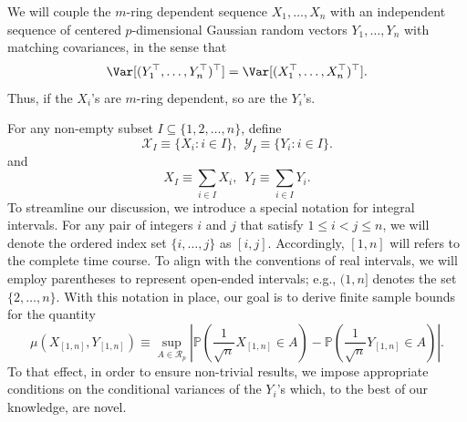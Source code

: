 \documentclass[aos]{imsart}
\begin{document}
We will couple the $m$-ring dependent sequence $X_1,\ldots,X_n$ with an independent sequence of centered $p$-dimensional Gaussian random vectors  $Y_1, \dots, Y_n$  with matching covariances, in the sense that
\begin{equation*}
    \Var[(Y_1^\top, \dots, Y_n^\top)^\top] = \Var[(X_1^\top, \dots, X_n^\top)^\top].
\end{equation*}
Thus, if the $X_i$'s are $m$-ring dependent, so are the $Y_i$'s.

For any non-empty subset $I \subseteq \{1, 2, \ldots, n\}$, define
\begin{equation*}
    \mathscr{X}_I \equiv \{ X_i: i \in I \}, ~~
    \mathscr{Y}_I \equiv \{ Y_i: i \in I \}.
\end{equation*}
and
\begin{equation} \label{eq:X_I_Y_I}
    X_I \equiv \sum_{i \in I} X_i, ~~
    Y_I \equiv \sum_{i \in I} Y_i.
\end{equation}
To streamline our discussion, we introduce a special notation for integral intervals. For any pair of integers $i$ and $j$ that satisfy $1 \leq i < j \leq n$, we will denote the ordered index set $\{i, \dots, j\}$ as $[i,j]$. Accordingly, $[1,n]$ will refers to the complete time course. To align with the conventions of real intervals, we will employ parentheses to represent open-ended intervals; e.g., $(1,n]$ denotes the set $\{2, \dots, n\}$. %
With this notation in place, our goal is to derive finite sample bounds for the  quantity
\begin{equation}\label{eq:mu}
\mu\left( X_{[1,n]}, Y_{[1,n]} \right) \equiv \sup_{A \in \mathcal{R}_p} \left| \mathbb{P} \left( \frac{1}{\sqrt{n}} X_{[1,n]} \in A \right) - \mathbb{P} \left( \frac{1}{\sqrt{n}} Y_{[1,n]} \in A \right) \right|.
\end{equation}
To that effect, in order to ensure non-trivial results, we impose appropriate conditions on the conditional variances of the $Y_i$'s which, to the best of our knowledge, are novel. 
\end{document}
